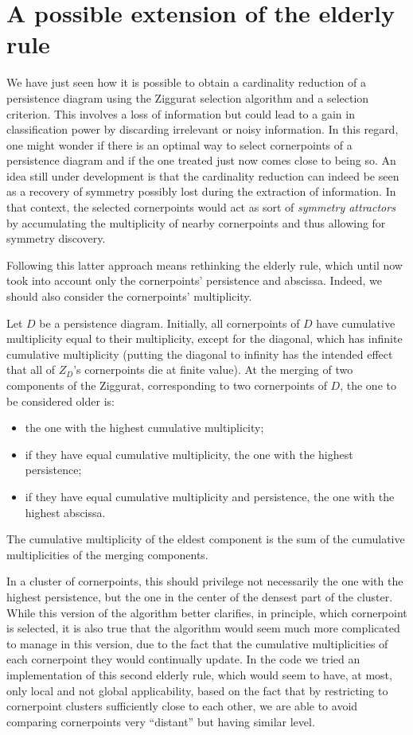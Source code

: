 \documentclass[english, LaM, oneside, noexaminfo]{sapthesis}
\begin{document}
\section{A possible extension of the elderly rule}
\label{new elderly rule}

We have just seen how it is possible to obtain a cardinality reduction of a persistence diagram using the Ziggurat selection algorithm and a selection criterion. This involves a loss of information but could lead to a gain in classification power by discarding irrelevant or noisy information. In this regard, one might wonder if there is an optimal way to select cornerpoints of a persistence diagram and if the one treated just now comes close to being so. An idea still under development is that the cardinality reduction can indeed be seen as a recovery of symmetry possibly lost during the extraction of information. In that context, the selected cornerpoints would act as sort of \textit{symmetry attractors} by accumulating the multiplicity of nearby cornerpoints and thus allowing for symmetry discovery.

Following this latter approach means rethinking the elderly rule, which until now took into account only the cornerpoints' persistence and abscissa. Indeed, we should also consider the cornerpoints' multiplicity.

Let $D$ be a persistence diagram. Initially, all cornerpoints of $D$ have cumulative multiplicity equal to their multiplicity, except for the diagonal, which has infinite cumulative multiplicity (putting the diagonal to infinity has the intended effect that all of $Z_D$'s cornerpoints die at finite value).
At the merging of two components of the Ziggurat, corresponding to two cornerpoints of $D$, the one to be considered older is:
\begin{itemize}
\item the one with the highest cumulative multiplicity;
\item if they have equal cumulative multiplicity, the one with the highest persistence;
\item if they have equal cumulative multiplicity and persistence, the one with the highest abscissa.
\end{itemize}
The cumulative multiplicity of the eldest component is the sum of the cumulative multiplicities of the merging components.

In a cluster of cornerpoints, this should privilege not necessarily the one with the highest persistence, but the one in the center of the densest part of the cluster.
While this version of the algorithm better clarifies, in principle, which cornerpoint is selected, it is also true that the algorithm would seem much more complicated to manage in this version, due to the fact that the cumulative multiplicities of each cornerpoint they would continually update. In the code we tried an implementation of this second elderly rule, which would seem to have, at most, only local and not global applicability, based on the fact that by restricting to cornerpoint clusters sufficiently close to each other, we are able to avoid comparing cornerpoints very ``distant'' but having similar level.
\end{document}
